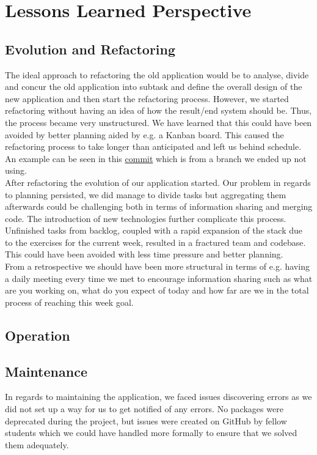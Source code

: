 \section{Lessons Learned Perspective}

\subsection{Evolution and Refactoring}
The ideal approach to refactoring the old application would be to analyse, divide and concur the old application into 
subtask and define the overall design of the new application and then start the refactoring process. However, we started
refactoring without having an idea of how the result/end system should be. Thus, the process became very unstructured. 
We have learned that this could have been avoided by better planning aided by e.g. a Kanban board. This caused the 
refactoring process to take longer than anticipated and left us behind schedule. An example can be seen in this
\href{https://github.com/organizationGB/DevOps/commit/7bbccc97d6d69e90724b00e93e92334210490085}{commit} which is from a 
branch we ended up not using. \\

After refactoring the evolution of our application started. Our problem in regards to planning persisted, we did manage
to divide tasks but aggregating them afterwards could be challenging both in terms of information sharing and merging 
code. The introduction of new technologies further complicate this process. Unfinished tasks from backlog, coupled
with a rapid expansion of the stack due to the exercises for the current week, resulted in a fractured team and
codebase. This could have been avoided with less time pressure and better planning.\\

From a retrospective we should have been more structural in terms of e.g. having a daily meeting every time we met to encourage 
information sharing such as what are you working on, what do you expect of today and how far are we in the total process
of reaching this week goal.

\subsection{Operation}

\subsection{Maintenance}
In regards to maintaining the application, we faced issues discovering errors as we did not set up a way for us to get
notified of any errors. No packages were deprecated during the project, but issues were created on GitHub by 
fellow students which we could have handled more formally to ensure that we solved them adequately.

